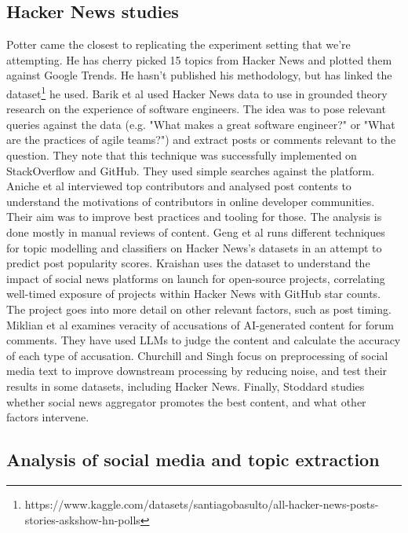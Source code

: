 \documentclass[nonacm,sigconf]{acmart}
\begin{document}
\subsection{Hacker News studies}

Potter \cite{potterhackernews} came the closest to replicating the experiment setting that we're attempting. He has cherry picked 15 topics from Hacker News and plotted them against Google Trends. He hasn't published his methodology, but has linked the dataset\footnote{https://www.kaggle.com/datasets/santiagobasulto/all-hacker-news-posts-stories-askshow-hn-polls} he used. Barik et al \cite{barik15} used Hacker News data to use in grounded theory research on the experience of software engineers. The idea was to pose relevant queries against the data (e.g. "What makes a great software engineer?" or "What are the practices of agile teams?") and extract posts or comments relevant to the question. They note that this technique was successfully implemented on StackOverflow and GitHub. They used simple searches against the platform. Aniche et al \cite{aniche18} interviewed top contributors and analysed post contents to understand the motivations of contributors in online developer communities. Their aim was to improve best practices and tooling for those. The analysis is done mostly in manual reviews of content. Geng et al \cite{geng16} runs different techniques for topic modelling and classifiers on Hacker News's datasets in an attempt to predict post popularity scores. Kraishan \cite{kraishan25} uses the dataset to understand the impact of social news platforms on launch for open-source projects, correlating well-timed exposure of projects within Hacker News with GitHub star counts. The project goes into more detail on other relevant factors, such as post timing. Miklian et al \cite{miklian26} examines veracity of accusations of AI-generated content for forum comments. They have used LLMs to judge the content and calculate the accuracy of each type of accusation. Churchill and Singh \cite{churchill21} focus on preprocessing of social media text to improve downstream processing by reducing noise, and test their results in some datasets, including Hacker News. Finally, Stoddard \cite{stoddard15} studies whether social news aggregator promotes the best content, and what other factors intervene.

\subsection{Analysis of social media and topic extraction}
\end{document}

